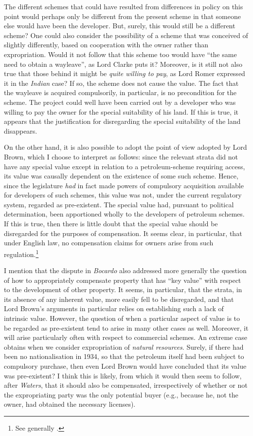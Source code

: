 The different schemes that could have resulted from differences in policy on this point would perhaps only be different from the present scheme in that someone else would have been the developer. But, surely, this would still be a different scheme? One could also consider the possibility of a scheme that was conceived of slightly differently, based on cooperation with the owner rather than expropriation. Would it not follow that this scheme too would have ``the same need to obtain a wayleave'', as Lord Clarke puts it? Moreover, is it still not also true that those behind it might be \emph{quite willing to pay}, as Lord Romer expressed it in the \emph{Indian} case? If so, the scheme does not cause the value. The fact that the wayleave is acquired compulsorily, in particular, is no precondition for the scheme. The project could well have been carried out by a developer who was willing to pay the owner for the special suitability of his land. If this is true, it appears that the justification for disregarding the special suitability of the land disappears.

On the other hand, it is also possible to adopt the point of view adopted by Lord Brown, which I choose to interpret as follows: since the relevant strata did not have any special value except in relation to a petroleum-scheme requiring access, its value was causally dependent on the existence of some such scheme. Hence, since the legislature {\it had} in fact made powers of compulsory acquisition available for developers of such schemes, this value was not, under the current regulatory system, regarded as pre-existent. The special value had, pursuant to political determination, been apportioned wholly to the developers of petroleum schemes. If this is true, then there is little doubt that the special value should be disregarded for the purposes of compensation. It seems clear, in particular, that under English law, no compensation claims for owners arise from such regulation.\footnote{See generally \cite{alterman10}.}

I mention that the dispute in {\it Bocardo} also addressed more generally the question of how to appropriately compensate property that has ``key value'' with respect to the development of other property. It seems, in particular, that the strata, in its absence of any inherent value, more easily fell to be disregarded, and that Lord Brown's arguments in particular relies on establishing such a lack of intrinsic value. However, the question of when a particular aspect of value is to be regarded as pre-existent tend to arise in many other cases as well. Moreover, it will arise particularly often with respect to commercial schemes. An extreme case obtains when we consider expropriation of \emph{natural resources}. Surely, if there had been no nationalisation in 1934, so that the petroleum itself had been subject to compulsory purchase, then even Lord Brown would have concluded that its value was pre-existent? I think this is likely, from which it would then seem to follow, after {\it Waters}, that it should also be compensated, irrespectively of whether or not the expropriating party was the only potential buyer (e.g., because he, not the owner, had obtained the necessary licenses).


